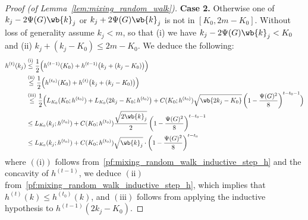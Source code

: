 \documentclass{article}
\newcommand{\1}{\mathbf{1}}
\theoremstyle{definition}
\theoremstyle{remark}
\begin{document}
\begin{proof}[Proof (of Lemma~\ref{lem:mixing_random_walk})]
	\textbf{Case 2.} Otherwise one of $k_j - 2 \Psi(G) \wb{k}_j$ or $k_j + 2 \Psi(G) \wb{k}_j$ is not in $[K_0,2m  - K_0]$. Without loss of generality assume $k_j < m$, so that (i) we have $k_j - 2 \Psi(G) \wb{k}_j < K_0$ and (ii) $k_j + (k_j - K_0) \leq 2m - K_0$. We deduce the following:
	\begin{align*}
	h^{(t)}(k_j) & \overset{(\textrm{i})}{\leq} \frac{1}{2}\Bigl(h^{(t - 1)}(K_0) + h^{(t - 1)}\bigl(k_j + (k_j - K_0)\bigr)\Bigr) \\
	& \overset{(\textrm{ii})}{\leq} \frac{1}{2}\Bigl(h^{(t_0)}(K_0) + h^{(t)}\bigl(k_j + (k_j - K_0)\bigr)\Bigr) \\
	& \overset{(\textrm{iii})}{\leq}\frac{1}{2}\Bigl(L_{K_0}(K_0;h^{(t_0)}) + L_{K_0}(2k_j - K_0; h^{(t_0)}\bigr) + C(K_0;h^{(t_0)})\sqrt{\wb{2k_j - K_0}}\left(1 - \frac{\Psi(G)^2}{8}\right)^{t - t_0 - 1}\Bigr) \\
	& \leq L_{K_0}(k_j; h^{(t_0)}) + C(K_0;h^{(t_0)}) \frac{\sqrt{2\wb{k}_j}}{2} \left(1 - \frac{\Psi(G)^2}{8}\right)^{t - t_0 - 1} \\
	& \leq L_{K_0}(k_j;h^{(t_0)}) + C(K_0;h^{(t_0)}) \sqrt{\wb{k}_j} \cdot \left(1 - \frac{\Psi(G)^2}{8}\right)^{t - t_0}
	\end{align*}
	where $(\textrm{(i)})$ follows from~\eqref{pf:mixing_random_walk_inductive_step_h} and the concavity of $h^{(t - 1)}$,  we deduce $(\textrm{ii})$ from~\eqref{pf:mixing_random_walk_inductive_step_h}, which implies that $h^{(t)}(k) \leq h^{(t_0)}(k)$, and $(\textrm{iii})$ follows from applying the inductive hypothesis to $h^{(t - 1)}(2k_j - K_0)$. 	
\end{proof}
\end{document}
